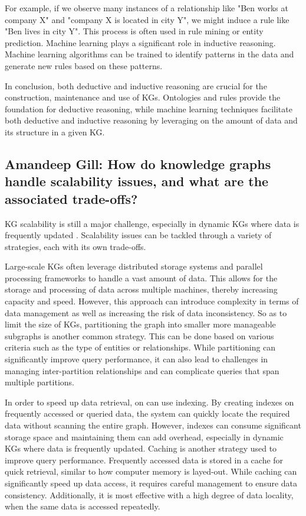 \documentclass[11pt]{article} %
\begin{document}
For example, if we observe many instances of a relationship like "Ben works at company X" and "company X is located in city Y", we might induce a rule like "Ben lives in city Y". This process is often used in rule mining or entity prediction. Machine learning plays a significant role in inductive reasoning. Machine learning algorithms can be trained to identify patterns in the data and generate new rules based on these patterns.

In conclusion, both deductive and inductive reasoning are crucial for the construction, maintenance and use of KGs. Ontologies and rules provide the foundation for deductive reasoning, while machine learning techniques facilitate both deductive and inductive reasoning by leveraging on the amount of data and its structure in a given KG.

\subsection{Amandeep Gill:  How do knowledge graphs handle scalability issues, and what are the associated trade-offs?}

KG scalability is still a major challenge, especially in dynamic KGs where data is frequently updated \cite*{CKG23}. Scalability issues can be tackled through a variety of strategies, each with its own trade-offs.

Large-scale KGs often leverage distributed storage systems and parallel processing frameworks to handle a vast amount of data. This allows for the storage and processing of data across multiple machines, thereby increasing capacity and speed. However, this approach can introduce complexity in terms of data management as well as increasing the risk of data inconsistency. So as to limit the size of KGs, partitioning the graph into smaller more manageable subgraphs is another common strategy. This can be done based on various criteria such as the type of entities or relationships. While partitioning can significantly improve query performance, it can also lead to challenges in managing inter-partition relationships and can complicate queries that span multiple partitions.

In order to speed up data retrieval, on can use indexing. By creating indexes on frequently accessed or queried data, the system can quickly locate the required data without scanning the entire graph. However, indexes can consume significant storage space and maintaining them can add overhead, especially in dynamic KGs where data is frequently updated. Caching is another strategy used to improve query performance. Frequently accessed data is stored in a cache for quick retrieval, similar to how computer memory is layed-out. While caching can significantly speed up data access, it requires careful management to ensure data consistency. Additionally, it is most effective with a high degree of data locality, when the same data is accessed repeatedly.
\end{document}
